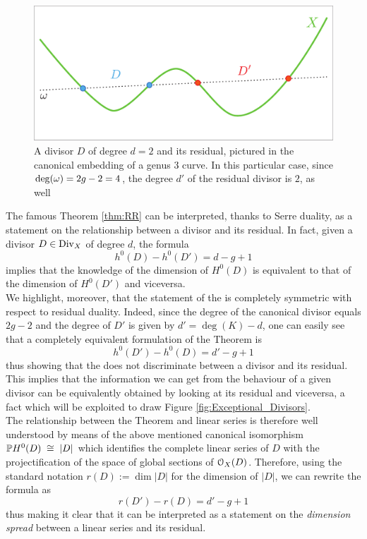	\begin{figure}[ht]
			\centering
			\includegraphics[width=\textwidth]{Duality.pdf}
			\caption{A divisor $D$ of degree $d=2$ and its residual, pictured in the canonical embedding of a genus $3$ curve. In this particular case, since $\deg(\omega)=2g-2=4$, the degree $d'$ of the residual divisor is $2$, as well }
			\label{fig:Duality}
	\end{figure}

	The famous \RR Theorem \ref{thm:RR} can be interpreted, thanks to Serre duality, as a statement on the relationship between a divisor and its residual. In fact, given a divisor $D\in \operatorname{Div}_X$ of degree $d$, the \RR formula
	$$ h^0(D) - h^0(D') = d-g+1 $$
	implies that the knowledge of the dimension of $H^0(D)$ is equivalent to that of the dimension of $H^0(D')$ and viceversa.\\

	We highlight, moreover, that the statement of the \RR is completely symmetric with respect to residual duality. Indeed, since the degree of the canonical divisor equals $2g-2$ and the degree of $D'$ is given by $d' = \deg(K)-d$, one can easily see that a completely equivalent formulation of the Theorem is
	$$ h^0(D') - h^0(D) = d'-g+1 $$
	thus showing that the \RR does not discriminate between a divisor and its residual. This implies that the information we can get from the behaviour of a given divisor can be equivalently obtained by looking at its residual and viceversa, a fact which will be exploited to draw Figure \ref{fig:Exceptional_Divisors}.\\

	The relationship between the Theorem and linear series is therefore well understood by means of the above mentioned canonical isomorphism
	$ \mathbb{P} H^0(D) \;\cong\; |D| $
	which identifies the complete linear series of $D$ with the projectification of the space of global sections of $\mathcal{O}_X(D)$. Therefore, using the standard notation $r(D):= \dim|D| $ for the dimension of $|D|$, we can rewrite the \RR formula as
	\begin{equation}\label{eq:RR}
		r(D') - r(D) = d'-g+1
	\end{equation}
	thus making it clear that it can be interpreted as a statement on the \emph{dimension spread} between a linear series and its residual.\\

